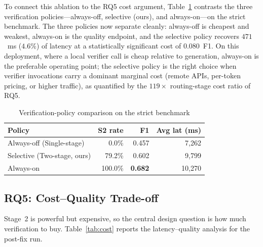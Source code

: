 \documentclass[pdflatex,sn-mathphys-num]{sn-jnl}
\begin{document}
To connect this ablation to the RQ5 cost argument,
Table~\ref{tab:trigger_policy} contrasts the three verification
policies---always-off, selective (ours), and always-on---on the strict
benchmark. The three policies now separate cleanly: always-off is cheapest
and weakest, always-on is the quality endpoint, and the selective policy
recovers $471$~ms ($4.6\%$) of latency at a statistically significant cost
of $0.080$~F1. On this deployment, where a local verifier call is cheap
relative to generation, always-on is the preferable operating point; the
selective policy is the right choice when verifier invocations carry a
dominant marginal cost (remote APIs, per-token pricing, or higher traffic),
as quantified by the $119\times$ routing-stage cost ratio of RQ5.

\begin{table}[!htbp]
\centering
\caption{Verification-policy comparison on the strict
benchmark}\label{tab:trigger_policy}
\begin{tabular}{lrrr}
\toprule
\textbf{Policy} & \textbf{S2 rate} & \textbf{F1} & \textbf{Avg lat (ms)} \\
\midrule
Always-off (Single-stage) & 0.0\%   & 0.457 & 7{,}262 \\
Selective (Two-stage, ours) & 79.2\% & 0.602 & 9{,}799 \\
Always-on & 100.0\% & \textbf{0.682} & 10{,}270 \\
\bottomrule
\end{tabular}
\end{table}

\subsection{RQ5: Cost--Quality Trade-off}\label{subsec:rq5}

Stage~2 is powerful but expensive, so the central design question is how much
verification to buy. Table~\ref{tab:cost} reports the latency--quality
analysis for the post-fix run.
\end{document}

